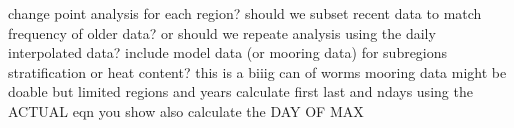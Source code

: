 \markdownRendererDocumentBegin
\markdownRendererUlBeginTight
\markdownRendererUlItem change point analysis for each region?\markdownRendererUlItemEnd 
\markdownRendererUlItem should we subset recent data to match frequency of older data? or should we repeate analysis using the daily interpolated data?\markdownRendererUlItemEnd 
\markdownRendererUlItem include model data (or mooring data) for subregions stratification or heat content? this is a biiig can of worms\markdownRendererUlItemEnd 
\markdownRendererUlItem mooring data might be doable but limited regions and years\markdownRendererUlItemEnd 
\markdownRendererUlItem calculate first last and ndays using the ACTUAL eqn you show\markdownRendererUlItemEnd 
\markdownRendererUlItem also calculate the DAY OF MAX\markdownRendererUlItemEnd 
\markdownRendererUlEndTight \markdownRendererDocumentEnd